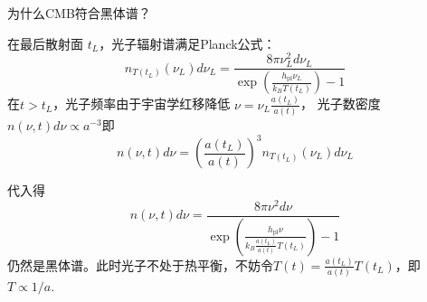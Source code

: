 \documentclass[12pt]{ctexart}
\begin{document}
为什么CMB符合黑体谱？

在最后散射面 $t_L$，光子辐射谱满足Planck公式：
\begin{equation}
    n_{T(t_L)}(\nu_L) d \nu_L=\frac{8 \pi \nu_L^{2} d \nu_L}{\exp \left(\frac{h_\text{pl} \nu_L}{k_{B} T(t_L)} \right)-1}
\end{equation}
在$t>t_L$，光子频率由于宇宙学红移降低 $\nu=\nu_{L} \frac{a(t_L)}{a(t)}$，
光子数密度 $n\left(\nu, t\right) d\nu \propto a^{-3}$即
\begin{equation}
    n(\nu, t) d \nu=\left(\frac{a(t_L)}{a(t)}\right)^{3} n_{T\left(t_{L}\right)}\left(\nu_{L}\right) d \nu_{L}
\end{equation}

代入得
\begin{equation}
    n(\nu, t) d \nu = \frac{8 \pi \nu^{2} d \nu}{\exp \left(\frac{h_\text{pl} \nu}{k_{B} \frac{a(t_L)}{a(t)}T(t_L)}   \right)-1}
\end{equation}
仍然是黑体谱。此时光子不处于热平衡，不妨令$T(t)=\frac{a(t_L)}{a(t)}T(t_L)$，即$T\propto 1/a$.
\end{document}

